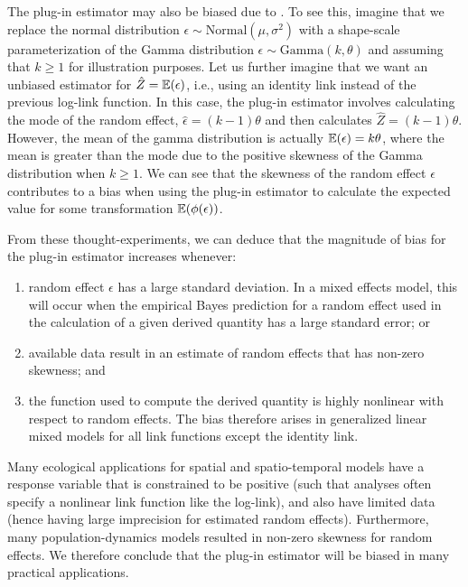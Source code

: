 The plug-in estimator may also be biased due to .  To see this, imagine that we replace the normal distribution \( \epsilon \sim \mathrm{Normal} (\mu, \sigma^2) \) with a shape-scale parameterization of the Gamma distribution \( \epsilon \sim \mathrm{Gamma} (k, \theta) \) and assuming that \(k \geq 1\) for illustration purposes.  Let us further imagine that we want an unbiased estimator for \(\hat Z = \operatorname{\mathbb{E}}(\epsilon)\), i.e., using an identity link instead of the previous log-link function.  In this case, the plug-in estimator involves calculating the mode of the random effect, \( \hat \epsilon = (k-1)\theta \) and then calculates \( \hat Z = (k-1)\theta \).  However, the mean of the gamma distribution is actually \( \operatorname{\mathbb{E}}(\epsilon) = k \theta \), where the mean is greater than the mode due to the positive skewness of the Gamma distribution when \(k \geq 1\).  We can see that the skewness of the random effect \(\epsilon\) contributes to a bias when using the plug-in estimator to calculate the expected value for some transformation \(\operatorname{\mathbb{E}}(\phi(\epsilon))\).  

From these thought-experiments, we can deduce that the magnitude of bias for the plug-in estimator increases whenever:
\begin{enumerate}
    \item random effect \(\epsilon\) has a large standard deviation.  In a mixed effects model, this will occur when the empirical Bayes prediction for a random effect used in the calculation of a given derived quantity has a large standard error; or

    \item available data result in an estimate of random effects that has non-zero skewness; and

    \item the function used to compute the derived quantity is highly nonlinear with respect to random effects.  The bias therefore arises in generalized linear mixed models for all link functions except the identity link.
\end{enumerate}
Many ecological applications for spatial and spatio-temporal models have a response variable that is constrained to be positive (such that analyses often specify a nonlinear link function like the log-link), and also have limited data (hence having large imprecision for estimated random effects).  Furthermore, many population-dynamics models resulted in non-zero skewness for random effects.  We therefore conclude that the plug-in estimator will be biased in many practical applications.  


